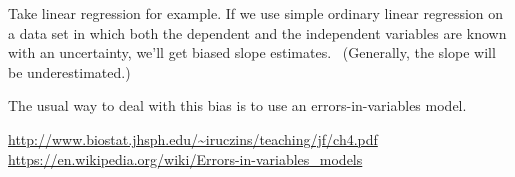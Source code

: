 \documentclass[a4paper,14pt]{article}
\begin{document}
Take linear regression for example. If we use simple ordinary linear regression on a data set in which
both the dependent and the independent variables are known with an uncertainty,
we'll get biased slope estimates.~\cite[p.~55]{EIP} (Generally, the slope will be underestimated.)

The usual way to deal with this bias is to use an errors-in-variables model.~\cite{EIV-models}

\begin{thebibliography}{9}
  \url{http://www.biostat.jhsph.edu/~iruczins/teaching/jf/ch4.pdf}
  \url{https://en.wikipedia.org/wiki/Errors-in-variables_models}
\end{thebibliography}
\end{document}
